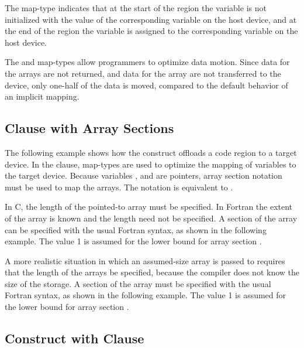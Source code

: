 The  map-type indicates that at the start of the  region 
the variable  is not initialized with the value of the corresponding variable 
on the host device, and at the end of the  region the variable  
is assigned to the corresponding variable on the host device.


The  and  map-types allow programmers to optimize data 
motion. Since data for the  arrays are not returned, and data for the  array 
are not transferred to the device, only one-half of the data is moved, compared 
to the default behavior of an implicit mapping.


\subsection{ Clause with Array Sections}
\label{subsec:target_array_section}

The following example shows how the  construct offloads a code region 
to a target device. In the  clause, map-types are used to optimize 
the mapping of variables to the target device. Because variables ,  and  are 
pointers, array section notation must be used to map the arrays. The notation  
is equivalent to .


In C, the length of the pointed-to array must be specified. In Fortran the extent 
of the array is known and the length need not be specified. A section of the array 
can be specified with the usual Fortran syntax, as shown in the following example. 
The value 1 is assumed for the lower bound for array section .


A more realistic situation in which an assumed-size array is passed to  
requires that the length of the arrays be specified, because the compiler does 
not know the size of the storage. A section of the array must be specified with 
the usual Fortran syntax, as shown in the following example. The value 1 is assumed 
for the lower bound for array section .


\subsection{ Construct with  Clause}
\label{subsec:target_if}

